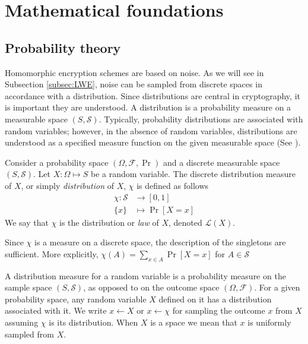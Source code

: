 \chapter{Mathematical foundations}
\section{Probability theory}
Homomorphic encryption schemes are based on noise. As we will see in Subsection \ref{subsec:LWE}, noise can be sampled from discrete spaces in accordance with a distribution. Since distributions are central in cryptography, it is important they are understood. A distribution is a probability measure on a measurable space $(S, \mathcal{S})$. Typically, probability distributions are associated with random variables; however, in the absence of random variables, distributions are understood as a specified measure function on the given measurable space (See \cite[pp. 83]{kallenberg-probability}).
\begin{definition}
Consider a probability space $(\Omega, \mathcal{F}, \operatorname{Pr})$ and a discrete measurable space $(S,\mathcal{S})$. Let $X \colon \Omega \mapsto S$ be a random variable. The discrete distribution measure of $X$, or simply \emph{distribution} of $X$, $\chi$ is defined as follows
\begin{equation*}
\begin{aligned}
    \chi \colon \mathcal{S} &\to [0,1]\\
    \{x\} &\mapsto \operatorname{Pr}[X = x]
\end{aligned}
\end{equation*}
We say that $\chi$ is the distribution or \emph{law} of $X$, denoted $\mathcal{L}(X)$. 
\end{definition}
\begin{remark}
    Since $\chi$ is a measure on a discrete space, the description of the singletons are sufficient. More explicitly, $\chi(A) = \sum_{x \in A} \operatorname{Pr}[X = x]$ for $A \in \mathcal{S}$
\end{remark}
A distribution measure for a random variable is a probability measure on the sample space $(S,\mathcal{S})$, as opposed to on the outcome space $(\Omega, \mathcal{F})$. For a given probability space, any random variable $X$ defined on it has a distribution associated with it. We write $x \leftarrow X$ or $x \leftarrow \chi$ for sampling the outcome $x$ from $X$ assuming $\chi$ is its distribution. When $X$ is a space we mean that $x$ is uniformly sampled from $X$.

